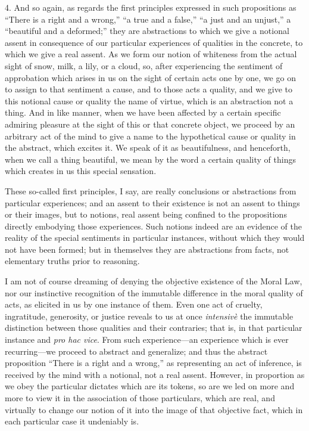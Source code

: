 4. And so again, as regards the first principles expressed in such
propositions as ``There is a right and a wrong,'' ``a true
and a false,'' ``a just and an unjust,'' a ``beautiful
and a deformed;'' they are abstractions to which we give a
notional assent in consequence of our particular experiences of
qualities in the concrete, to which we give a real assent. As we form
our notion of whiteness from the actual sight of snow, milk, a lily,
or a cloud, so, after experiencing the sentiment of approbation which
arises in us on the sight of certain acts one by one, we go on to
assign to that sentiment a cause, and to those acts a quality, and we
give to this notional cause or quality the name of virtue, which is an
abstraction not a thing. And in like manner, when we have been
affected by a certain specific admiring pleasure at the sight of this
or that concrete object, we proceed by an arbitrary act of the mind to
give a name to the hypothetical cause or quality in the abstract,
which excites it. We speak of it as beautifulness, and henceforth,
when we call a thing beautiful, we mean by the word a certain
quality of things which creates in us this special sensation.

These so-called first principles, I say, are really conclusions or
abstractions from particular experiences; and an assent to their
existence is not an assent to things or their images, but to notions,
real assent being confined to the propositions directly embodying
those experiences. Such notions indeed are an evidence of the reality
of the special sentiments in particular instances, without which they
would not have been formed; but in themselves they are abstractions
from facts, not elementary truths prior to reasoning.

I am not of course dreaming of denying the objective existence of
the Moral Law, nor our instinctive recognition of the immutable
difference in the moral quality of acts, as elicited in us by one
instance of them. Even one act of cruelty, ingratitude, generosity, or
justice reveals to us at once \emph{intensivè} the immutable
distinction between those qualities and their contraries; that is, in
that particular instance and \emph{pro hac vice}. From such experience—an
experience which is ever recurring—we proceed to abstract and
generalize; and thus the abstract proposition ``There is a right
and a wrong,'' as representing an act of inference, is received by
the mind with a notional, not a real assent. However, in proportion as
we obey the particular dictates which are its tokens, so are we led on
more and more to view it in the association of those particulars,
which are real, and virtually to change our notion of it into the
image of that objective fact, which in each particular case it
undeniably is.

